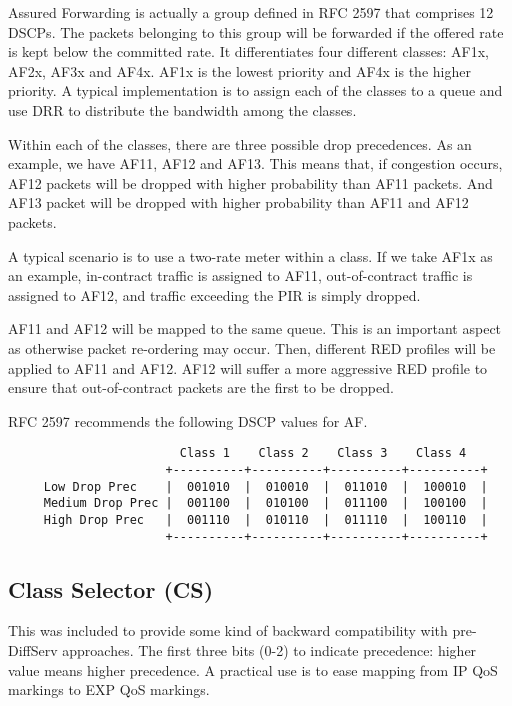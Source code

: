 Assured Forwarding is actually a group defined in RFC 2597 \cite{rfc2597} that comprises 12 DSCPs.
The packets belonging to this group will be forwarded if the offered rate is kept below the committed rate.
It differentiates four different classes: AF1x, AF2x, AF3x and AF4x.
AF1x is the lowest priority and AF4x is the higher priority.
A typical implementation is to assign each of the classes to a queue and use DRR to distribute the bandwidth among the classes.

Within each of the classes, there are three possible drop precedences.
As an example, we have AF11, AF12 and AF13.
This means that, if congestion occurs, AF12 packets will be dropped with higher probability than AF11 packets.
And AF13 packet will be dropped with higher probability than AF11 and AF12 packets.

A typical scenario is to use a two-rate meter within a class.
If we take AF1x as an example, in-contract traffic is assigned to AF11, out-of-contract traffic is assigned to AF12, and traffic exceeding the PIR is simply dropped.

AF11 and AF12 will be mapped to the same queue.
This is an important aspect as otherwise packet re-ordering may occur.
Then, different RED profiles will be applied to AF11 and AF12.
AF12 will suffer a more aggressive RED profile to ensure that out-of-contract packets are the first to be dropped.

RFC 2597 \cite{rfc2597} recommends the following DSCP values for AF.

{\scriptsize 
\begin{verbatim}
                        Class 1    Class 2    Class 3    Class 4
                      +----------+----------+----------+----------+
     Low Drop Prec    |  001010  |  010010  |  011010  |  100010  |
     Medium Drop Prec |  001100  |  010100  |  011100  |  100100  |
     High Drop Prec   |  001110  |  010110  |  011110  |  100110  |
                      +----------+----------+----------+----------+
\end{verbatim}
}

\subsection{Class Selector (CS)}
This was included to provide some kind of backward compatibility with pre-DiffServ approaches.
The first three bits (0-2) to indicate precedence: higher value means higher precedence.
A practical use is to ease mapping from IP QoS markings to EXP QoS markings.


